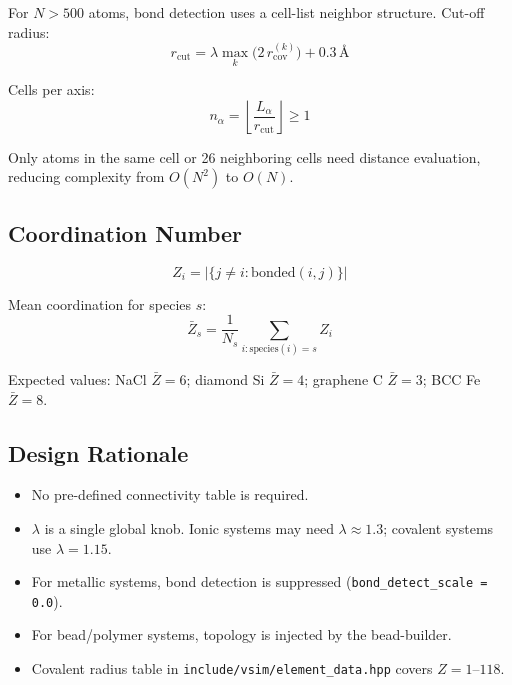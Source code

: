 \documentclass[11pt, a4paper, oneside]{article}
\newcommand{\ang}{\text{\AA}}
\newcommand{\rcut}{r_{\mathrm{cut}}}
\newcommand{\rcov}{r_{\mathrm{cov}}}
\begin{document}
For $N > 500$ atoms, bond detection uses a cell-list neighbor structure.
Cut-off radius:
\begin{equation}
  \rcut = \lambda \max_{k} \bigl(2\,\rcov^{(k)}\bigr) + 0.3\,\ang
  \label{eq:rcut}
\end{equation}

Cells per axis:
\begin{equation}
  n_\alpha = \left\lfloor \frac{L_\alpha}{\rcut} \right\rfloor \geq 1
  \label{eq:ncells}
\end{equation}

Only atoms in the same cell or 26 neighboring cells need distance evaluation,
reducing complexity from $O(N^2)$ to $O(N)$.

\subsection{Coordination Number}
\label{sec:bonds_coordination}

\begin{equation}
  Z_i = \bigl|\{j \neq i : \mathrm{bonded}(i,j)\}\bigr|
  \label{eq:coordination}
\end{equation}

Mean coordination for species $s$:
\begin{equation}
  \bar{Z}_s = \frac{1}{N_s} \sum_{i : \mathrm{species}(i) = s} Z_i
  \label{eq:mean_coord}
\end{equation}

Expected values: NaCl $\bar{Z}=6$; diamond Si $\bar{Z}=4$;
graphene C $\bar{Z}=3$; BCC Fe $\bar{Z}=8$.

\subsection{Design Rationale}
\label{sec:bonds_rationale}

\begin{itemize}
  \item No pre-defined connectivity table is required.
  \item $\lambda$ is a single global knob. Ionic systems may need
    $\lambda \approx 1.3$; covalent systems use $\lambda = 1.15$.
  \item For metallic systems, bond detection is suppressed
    (\texttt{bond\_detect\_scale = 0.0}).
  \item For bead/polymer systems, topology is injected by the bead-builder.
  \item Covalent radius table in \texttt{include/vsim/element\_data.hpp}
    covers $Z = 1$--$118$.
\end{itemize}
\end{document}
